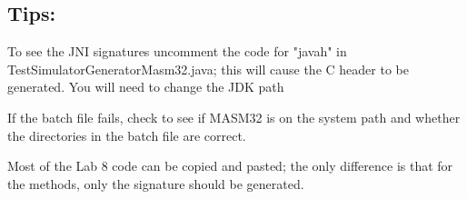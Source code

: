 \ei

\subsection{Tips:}

\biTight

\item To see the JNI signatures uncomment the code for "javah" in TestSimulatorGeneratorMasm32.java; this will cause the C header to be generated. You will need to change the JDK path

\item If the batch file fails, check to see if MASM32 is on the system path and whether the directories in the batch file are correct.

\item Most of the Lab 8 code can be copied and pasted; the only difference is that for the methods, only the signature should be generated.

\ei
